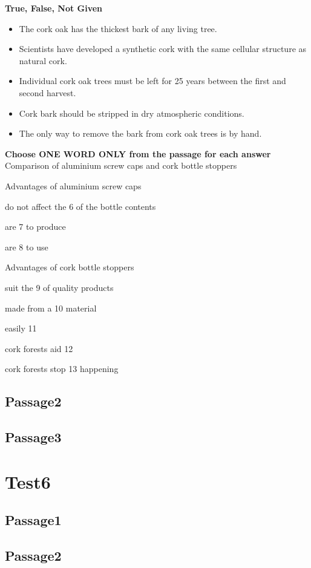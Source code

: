 \documentclass[conference]{IEEEtran}
\begin{document}
\textbf{True, False, Not Given}
    \begin{itemize}
        \item The cork oak has the thickest bark of any living tree.
        \item Scientists have developed a synthetic cork with the same cellular structure as natural cork.
        \item Individual cork oak trees must be left for 25 years between the first and second harvest.
        \item Cork bark should be stripped in dry atmospheric conditions.
        \item The only way to remove the bark from cork oak trees is by hand.
    \end{itemize}

\textbf{Choose ONE WORD ONLY from the passage for each answer}
Comparison of aluminium screw caps and cork bottle stoppers

Advantages of aluminium screw caps

do not affect the 
6
of the bottle contents

are
7
 to produce

are
8
 to use

Advantages of cork bottle stoppers

suit the 
9
of quality products

made from a 
10
material

easily
11

cork forests aid 
12

cork forests stop 
13
happening

\subsection{Passage2}
\subsection{Passage3}

\section{Test6}

\subsection{Passage1}
\subsection{Passage2}
\end{document}
